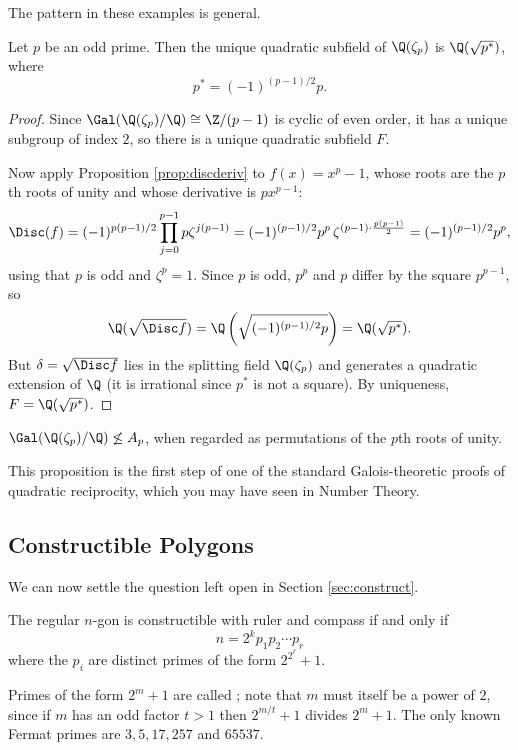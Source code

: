 The pattern in these examples is general.

\begin{proposition}\label{prop:quadsubfield}
	Let $p$ be an odd prime. Then the unique quadratic subfield of $\Q(\zeta_p)$ is $\Q(\sqrt{p^*})$, where
	$$p^* = (-1)^{(p-1)/2}p.$$
\end{proposition}

\begin{proof}
	Since $\Gal(\Q(\zeta_p)/\Q)\cong \Z/(p-1)$ is cyclic of even order, it has a unique subgroup of index $2$, so there is a unique quadratic subfield $F$.

	Now apply Proposition \ref{prop:discderiv} to $f(x) = x^p-1$, whose roots are the $p$th roots of unity and whose derivative is $px^{p-1}$:
	$$\Disc(f) = (-1)^{p(p-1)/2}\prod_{j=0}^{p-1}p\zeta^{j(p-1)} = (-1)^{(p-1)/2}p^p\,\zeta^{(p-1)\cdot\frac{p(p-1)}{2}} = (-1)^{(p-1)/2}p^p,$$
	using that $p$ is odd and $\zeta^{p} = 1$. Since $p$ is odd, $p^p$ and $p$ differ by the square $p^{p-1}$, so
	$$\Q(\sqrt{\Disc f}) = \Q\left(\sqrt{(-1)^{(p-1)/2}p}\right) = \Q(\sqrt{p^*}).$$
	But $\delta = \sqrt{\Disc f}$ lies in the splitting field $\Q(\zeta_p)$ and generates a quadratic extension of $\Q$ (it is irrational since $p^*$ is not a square). By uniqueness, $F = \Q(\sqrt{p^*})$.
\end{proof}

\begin{corollary}
	$\Gal(\Q(\zeta_p)/\Q) \not\leq A_p$, when regarded as permutations of the $p$th roots of unity.
\end{corollary}

This proposition is the first step of one of the standard Galois-theoretic proofs of quadratic reciprocity, which you may have seen in Number Theory.

\subsection{Constructible Polygons}

We can now settle the question left open in Section \ref{sec:construct}.

\begin{theorem}[Gauss]\label{thm:gausspoly}
	The regular $n$-gon is constructible with ruler and compass if and only if
	$$n = 2^k p_1p_2\cdots p_r$$
	where the $p_i$ are distinct primes of the form $2^{2^\ell}+1$.
\end{theorem}

Primes of the form $2^m+1$ are called ; note that $m$ must itself be a power of $2$, since if $m$ has an odd factor $t>1$ then $2^{m/t}+1$ divides $2^m+1$. The only known Fermat primes are $3, 5, 17, 257$ and $65537$.

